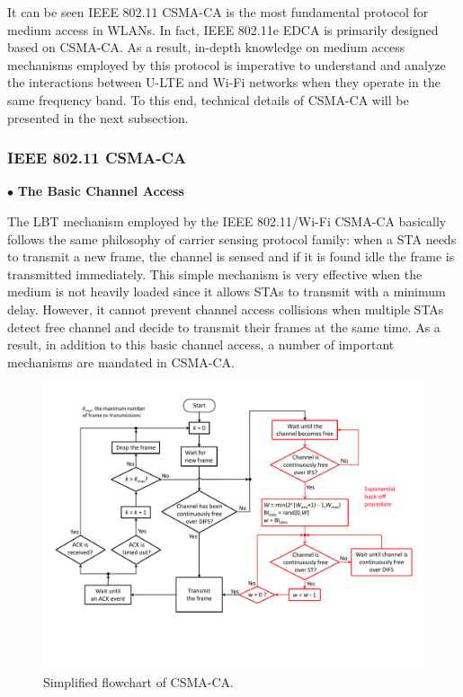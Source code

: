 \documentclass[12pt,onecolumn]{article}
\begin{document}
It can be seen IEEE 802.11 CSMA-CA is the most fundamental protocol for medium access in WLANs. In fact, IEEE 802.11e EDCA is primarily designed based on CSMA-CA. As a result, in-depth knowledge on medium access mechanisms employed by this protocol is imperative to understand and analyze the interactions between U-LTE and Wi-Fi networks when they operate in the same frequency band. To this end, technical details of CSMA-CA will be presented in the next subsection.

\subsubsection{IEEE 802.11 CSMA-CA}
\label{subsubsection:IEEE 802.11 CSMA-CA}

\vspace{3mm}
\noindent $\bullet$ \textbf{The Basic Channel Access}
\vspace{3mm}

\noindent The LBT mechanism employed by the IEEE 802.11/Wi-Fi CSMA-CA basically follows the same philosophy of carrier sensing protocol family: when a STA needs to transmit a new frame, the channel is sensed and if it is found idle the frame is transmitted immediately. This simple mechanism is very effective when the medium is not heavily loaded since it allows STAs to transmit with a minimum delay. However, it cannot prevent channel access collisions when multiple STAs detect free channel and decide to transmit their frames at the same time. As a result, in addition to this basic channel access, a number of important mechanisms are mandated in CSMA-CA.

\begin{figure}[!t]
\centering
\includegraphics[width=1.0\columnwidth]{figures2/CSMA-CA-flowchart}
\caption{Simplified flowchart of CSMA-CA.}
\label{figs:CSMA-CA-flowchart}
\end{figure}
\end{document}
